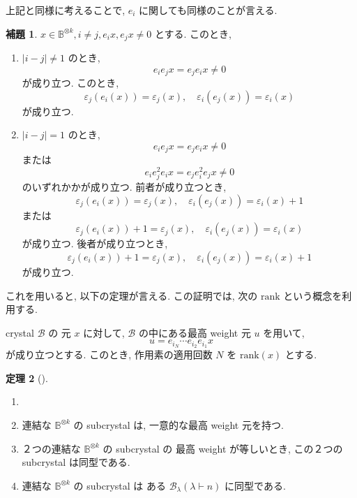\documentclass[
  a4paper, 
  12pt,
  ja=standard,
  xelatex,
  left=30truemm,
  right=30truemm,
  titlepage 
]{bxjsarticle}
\theoremstyle{definition}
\newtheorem{thm}{定理}[section]
\newtheorem{lem}[thm]{補題}
\begin{document}
上記と同様に考えることで, $e_i$ に関しても同様のことが言える.

\begin{lem}{\cite[定理4.11]{b2}} \label{stembridge}
  $x \in \mathbb{B}^{ \otimes k} , i \neq j, e_i x, e_j x \neq 0$ とする. このとき,
  \begin{enumerate}
    \item
    $| i - j | \neq 1$ のとき, 
    $$e_ie_j x =e_je_i x \neq 0$$
    が成り立つ.
    このとき,
    $$\varepsilon_j(e_i(x)) = \varepsilon_j(x), \quad \varepsilon_i(e_j(x)) = \varepsilon_i(x)$$
    が成り立つ.
    \item
    $| i - j | = 1$ のとき,
    $$e_ie_j x =e_je_i x \neq 0$$ 
    または
    $$e_ie_j^2e_i x = e_je_i^2e_j x \neq 0$$
    のいずれかかが成り立つ.
    前者が成り立つとき,
    $$\varepsilon_j(e_i(x)) = \varepsilon_j(x), \quad \varepsilon_i(e_j(x)) = \varepsilon_i(x) + 1$$
    または
    $$\varepsilon_j(e_i(x)) + 1 = \varepsilon_j(x), \quad \varepsilon_i(e_j(x)) = \varepsilon_i(x)$$
    が成り立つ.
    後者が成り立つとき,
    $$\varepsilon_j(e_i(x)) + 1 = \varepsilon_j(x), \quad \varepsilon_i(e_j(x)) = \varepsilon_i(x) + 1$$
    が成り立つ.
  \end{enumerate}
\end{lem}

これを用いると, 以下の定理が言える.
この証明では, 次の $\mathrm{rank}$ という概念を利用する.

crystal $\mathcal{B}$ の 元 $x$ に対して,
$\mathcal{B}$ の中にある最高 weight 元 $u$ を用いて, 
\[
u = e_{i_N} \cdots e_{i_2} e_{i_1} x
\]
が成り立つとする. このとき, 作用素の適用回数 $N$ を $\mathrm{rank}(x)$ とする.

\begin{thm} [{\cite[定理4.12, 定理4.13, 系6.2]{b2}}] \label{direct-sum-decomposition}
  \begin{enumerate}
    \item[]
    \item 連結な $\mathbb{B}^{ \otimes k}$ の subcrystal は, 一意的な最高 weight 元を持つ.
    \item ２つの連結な $\mathbb{B}^{ \otimes k}$ の subcrystal の 最高 weight が等しいとき, この２つの subcrystal は同型である.
    \item 連結な $\mathbb{B}^{ \otimes k}$ の subcrystal は ある $\mathcal{B}_{\lambda} ( \lambda \vdash n )$ に同型である.
  \end{enumerate}
\end{thm}
\end{document}
